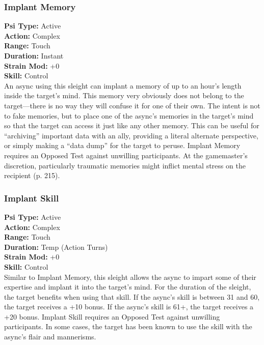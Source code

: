 \subsubsection{Implant Memory} \textbf{Psi Type:} Active \\ \textbf{Action:} Complex \\ \textbf{Range:} Touch \\ \textbf{Duration:} Instant \\ \textbf{Strain Mod:} +0 \\ \textbf{Skill:} Control\\ An async using this sleight can implant a memory of up to an hour’s length inside the target’s mind. This memory very obviously does not belong to the target—there is no way they will confuse it for one of their own. The intent is not to fake memories, but to place one of the async’s memories in the target’s mind so that the target can access it just like any other memory. This can be useful for “archiving” important data with an ally, providing a literal alternate perspective, or simply making a “data dump” for the target to peruse. Implant Memory requires an Opposed Test against unwilling participants. At the gamemaster’s discretion, particularly traumatic memories might inflict mental stress on the recipient (p. 215). 

\subsubsection{Implant Skill} \textbf{Psi Type:} Active \\ \textbf{Action:} Complex \\ \textbf{Range:} Touch \\ \textbf{Duration:} Temp (Action Turns) \\ \textbf{Strain Mod:} +0 \\ \textbf{Skill:} Control\\ Similar to Implant Memory, this sleight allows the async to impart some of their expertise and implant it into the target’s mind. For the duration of the sleight, the target benefits when using that skill. If the async’s skill is between 31 and 60, the target receives a +10 bonus. If the async’s skill is 61+, the target receives a +20 bonus. Implant Skill requires an Opposed Test against unwilling participants. In some cases, the target has been known to use the skill with the async’s flair and mannerisms. 

